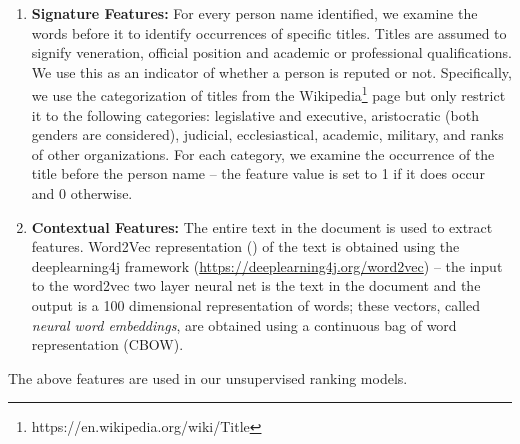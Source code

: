 \documentclass[a4paper,man,natbib]{apa6}
\begin{document}
\begin{enumerate}
\item \textbf{Signature Features: } For every person name identified, we examine the words before it to identify occurrences of specific titles. Titles are assumed to signify veneration, official position and academic  or professional qualifications. We use this as an indicator of whether a person is reputed or not. Specifically, we use the categorization of titles from the Wikipedia\footnote{https://en.wikipedia.org/wiki/Title} page but only restrict it to the following categories: legislative and executive, aristocratic (both genders are considered), judicial, ecclesiastical, academic, military, and ranks of other organizations. For each category, we examine the occurrence of the title before the person name -- the feature value is set to 1 if it does occur and 0 otherwise.

\item \textbf{Contextual Features: } The entire text in the document is used to extract features. Word2Vec representation (\cite{Mikolov_13a, Mikolov_13b}) of the text is obtained using the deeplearning4j framework (\url{https://deeplearning4j.org/word2vec}) -- the input to the word2vec two layer neural net is the text in the document and the output is a 100 dimensional representation of words; these vectors, called \emph{neural word embeddings}, are obtained using a continuous bag of word representation (CBOW). 

\end{enumerate}
The above features are used in our unsupervised ranking models.
\end{document}
